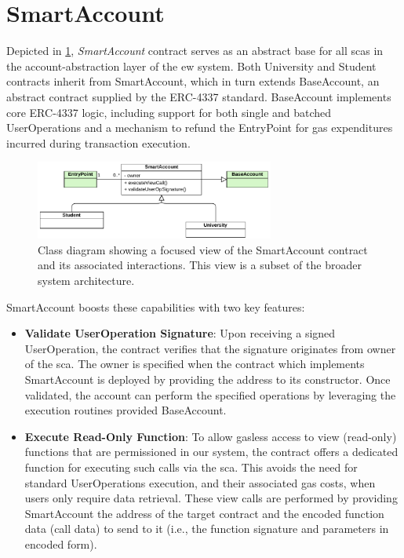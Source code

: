 \section{SmartAccount}
Depicted in \cref{fig:smartAccountContractClass}, \textit{SmartAccount} contract serves as an abstract base for all \acrlong{sca}s in the account-abstraction layer of the \acrlong{ew} system. Both University and Student contracts inherit from SmartAccount, which in turn extends BaseAccount, an abstract contract supplied by the ERC-4337 standard. BaseAccount implements core ERC-4337 logic, including support for both single and batched UserOperations and a mechanism to refund the EntryPoint for gas expenditures incurred during transaction execution.

\begin{figure}
  \centering
  \includegraphics[width=0.7\textwidth]{figures/SmartAccount class diagram.pdf}
  \caption[Class diagram focused on SmartAccount contract]{Class diagram showing a focused view of the SmartAccount contract and its associated interactions. This view is a subset of the broader system architecture.}
  \label{fig:smartAccountContractClass}
\end{figure}

SmartAccount boosts these capabilities with two key features:
\begin{itemize}
    \item \textbf{Validate UserOperation Signature}: Upon receiving a signed UserOperation, the contract verifies that the signature originates from owner of the \acrshort{sca}. The owner is specified when the contract which implements SmartAccount is deployed by providing the address to its constructor. Once validated, the account can perform the specified operations by leveraging the execution routines provided BaseAccount.
    \item \textbf{Execute Read-Only Function}: To allow gasless access to view (read-only) functions that are permissioned in our system, the contract offers a dedicated function for executing such calls via the \acrshort{sca}. This avoids the need for standard UserOperations execution, and their associated gas costs, when users only require data retrieval. These view calls are performed by providing SmartAccount the address of the target contract and the encoded function data (call data) to send to it (i.e., the function signature and parameters in encoded form).
\end{itemize}

